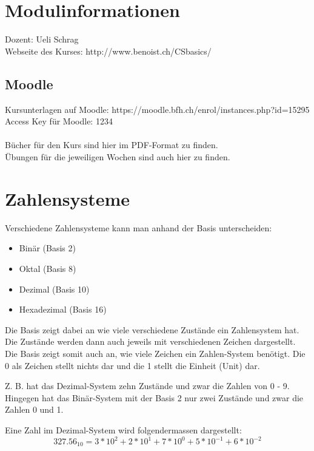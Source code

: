 \documentclass[12pt, a4paper, oneside]{article}
\title{\vspace{-1.5cm}\subjectIdentifier{}\\\subject{}}
\author{\vspace{-1.5cm}}
\date{\vspace{-1.5cm}}
\begin{document}
\maketitle
\thispagestyle{fancy}

\section{Modulinformationen}
Dozent: Ueli Schrag \\
Webseite des Kurses: http://www.benoist.ch/CSbasics/
\subsection{Moodle}
Kursunterlagen auf Moodle: https://moodle.bfh.ch/enrol/instances.php?id=15295 \\
Access Key für Moodle: 1234\\\\
Bücher für den Kurs sind hier im PDF-Format zu finden.\\
Übungen für die jeweiligen Wochen sind auch hier zu finden.

\section{Zahlensysteme}
Verschiedene Zahlensysteme kann man anhand der Basis unterscheiden:
\begin{itemize}
  \item Binär (Basis 2)
  \item Oktal (Basis 8)
  \item Dezimal (Basis 10)
  \item Hexadezimal (Basis 16)
\end{itemize}
Die Basis zeigt dabei an wie viele verschiedene Zustände ein Zahlensystem hat. Die Zustände werden dann auch jeweils mit verschiedenen Zeichen dargestellt. Die Basis zeigt somit auch an, wie viele Zeichen ein Zahlen-System benötigt. Die 0 als Zeichen stellt nichts dar und die 1 stellt die Einheit (Unit) dar.

Z. B. hat das Dezimal-System zehn Zustände und zwar die Zahlen von 0 - 9. Hingegen hat das Binär-System mit der Basis 2 nur zwei Zustände und zwar die Zahlen 0 und 1.

Eine Zahl im Dezimal-System wird folgendermassen dargestellt:
\begin{equation}
  327.56_{10} = 3 * 10^2 + 2 * 10^1 + 7 * 10^0 + 5 * 10^{-1} + 6 * 10^{-2}
\end{equation}
\end{document}
